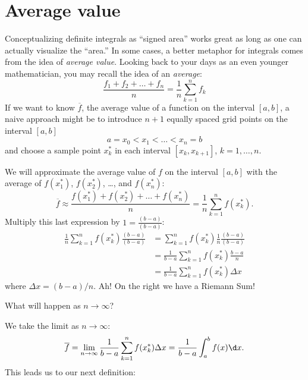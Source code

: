 \documentclass{ximera}
\begin{document}
\section{Average value}

Conceptualizing definite integrals as ``signed area'' works great as
long as one can actually visualize the ``area.'' In some cases, a
better metaphor for integrals comes from the idea of \textit{average
  value}.  Looking back to your days as an even younger mathematician,
you may recall the idea of an \textit{average}:
\[
\frac{f_1+f_2+\dots+f_n}{n} = \frac{1}{n}\sum_{k=1}^n f_k
\]
If we want to know $\overline{f}$, the average value of a function on the interval $[a,b]$, a naive approach
might be to introduce $n+1$ equally spaced
grid points on the interval $[a,b]$
\[
a=x_0 < x_1 < \dots < x_{n}=b
\]
and choose a sample point $x_k^*$ in  each interval $[x_k,x_{k+1}]$, $k=1,\dots,n$. 

We will approximate the average value of $f$ on the interval $[a,b]$ with the average of $f(x_1^*)$,
$f(x_2^*)$, \dots, and  $f(x_n^*)$:
\[
\overline{f}\approx\frac{f(x_1^*) + f(x_2^*) + \dots + f(x_n^*)}{n} = \frac1n\sum_{k=1}^n f(x_k^*).
\]
Multiply this last expression by $1 = \frac{(b-a)}{(b-a)}$:
\begin{align*}
  \frac1n \sum_{k=1}^n f(x_k^*)\frac{(b-a)}{(b-a)} &= \sum_{k=1}^n f(x_k^*)\frac1n \frac{(b-a)}{(b-a)} \\
  &= \frac{1}{b-a} \sum_{k=1}^n f(x_k^*)\frac{b-a}n  \\
  &=\frac{1}{b-a} \sum_{k=1}^n f(x_k^*)\Delta x
\end{align*}
where $\Delta x = (b-a)/n$.  Ah! On the right we have a Riemann Sum!

What will happen  as $n\to\infty$?

We take the limit as $n\to\infty$:
\[
\overline{f}=\lim_{n\to\infty} \frac{1}{b-a} \sum_{k=1}^n f(x_k^*)\Delta x = \frac{1}{b-a} \int_a^b f(x)\d x.
\]
This leads us to our next definition:
\end{document}
